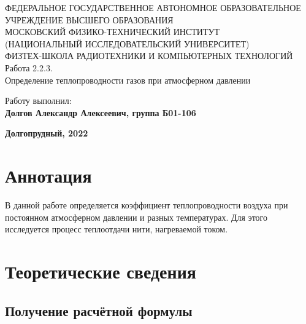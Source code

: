 \documentclass[15pt,a5paper,reqno]{article}
\begin{document}
\begin{center}
  {\small ФЕДЕРАЛЬНОЕ ГОСУДАРСТВЕННОЕ АВТОНОМНОЕ ОБРАЗОВАТЕЛЬНОЕ\\ УЧРЕЖДЕНИЕ ВЫСШЕГО ОБРАЗОВАНИЯ\\ МОСКОВСКИЙ ФИЗИКО-ТЕХНИЧЕСКИЙ ИНСТИТУТ\\ (НАЦИОНАЛЬНЫЙ ИССЛЕДОВАТЕЛЬСКИЙ УНИВЕРСИТЕТ)\\ ФИЗТЕХ-ШКОЛА РАДИОТЕХНИКИ И КОМПЬЮТЕРНЫХ ТЕХНОЛОГИЙ}\\
  \hfill \break
  \hfill \break
  \hfill \break
  \Huge{Работа 2.2.3. \\ Определение теплопроводности газов при атмосферном давлении}\\
\end{center}

\hfill \break
\hfill \break
\hfill \break
\hfill \break
\hfill \break
\hfill \break

\begin{flushright}
  \normalsize{Работу выполнил:}\\
  \normalsize{\textbf{Долгов Александр Алексеевич, группа Б01-106}}\\
\end{flushright}

\begin{center}
  \normalsize{\textbf{Долгопрудный, 2022}}
\end{center}


\thispagestyle{empty} %


\newpage
\thispagestyle{plain}
\tableofcontents
\thispagestyle{plain}
\newpage

\section{Аннотация}

    В данной работе определяется коэффициент теплопроводности воздуха при постоянном атмосферном давлении и разных температурах. Для этого исследуется процесс теплоотдачи нити, нагреваемой током.
	
\section{Теоретические сведения}

    \subsection{Получение расчётной формулы}
\end{document}
